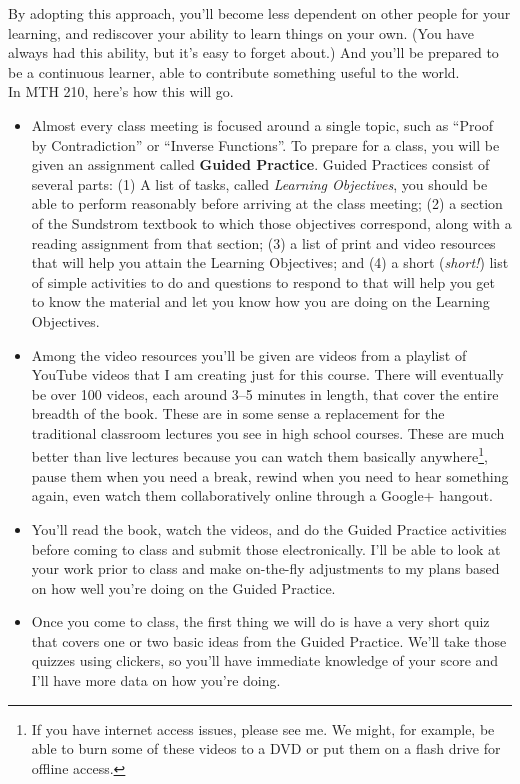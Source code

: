 \documentclass[11pt]{article}
\begin{document}
	By adopting this approach, you'll become less dependent on other people for your learning, and rediscover your ability to learn things on your own. (You have always had this ability, but it's easy to forget about.) And you'll be prepared to be a continuous learner, able to contribute something useful to the world. \\

	In MTH 210, here's how this will go. 
	\begin{itemize}[itemsep=0pt]
		\item Almost every class meeting is focused around a single topic, such as ``Proof by Contradiction'' or ``Inverse Functions''. To prepare for a class, you will be given an assignment called \textbf{Guided Practice}. Guided Practices consist of several parts: (1) A list of tasks, called \emph{Learning Objectives}, you should be able to perform reasonably before arriving at the class meeting; (2) a section of the Sundstrom textbook to which those objectives correspond, along with a reading assignment from that section; (3) a list of print and video resources that will help you attain the Learning Objectives; and (4) a short (\emph{short!}) list of simple activities to do and questions to respond to that will help you get to know the material and let you know how you are doing on the Learning Objectives. 
		\item Among the video resources you'll be given are videos from a playlist of YouTube videos that I am creating just for this course. There will eventually be over 100 videos, each around 3--5 minutes in length, that cover the entire breadth of the book. These are in some sense a replacement for the traditional classroom lectures you see in high school courses. These are much better than live lectures because you can watch them basically anywhere\footnote{If you have internet access issues, please see me. We might, for example, be able to burn some of these videos to a DVD or put them on a flash drive for offline access.}, pause them when you need a break, rewind when you need to hear something again, even watch them collaboratively online through a Google+ hangout. 
		\item You'll read the book, watch the videos, and do the Guided Practice activities before coming to class and submit those electronically. I'll be able to look at your work prior to class and make on-the-fly adjustments to my plans based on how well you're doing on the Guided Practice. 
		\item Once you come to class, the first thing we will do is have a very short quiz that covers one or two basic ideas from the Guided Practice. We'll take those quizzes using clickers, so you'll have immediate knowledge of your score and I'll have more data on how you're doing. 

\end{itemize}
\end{document}
